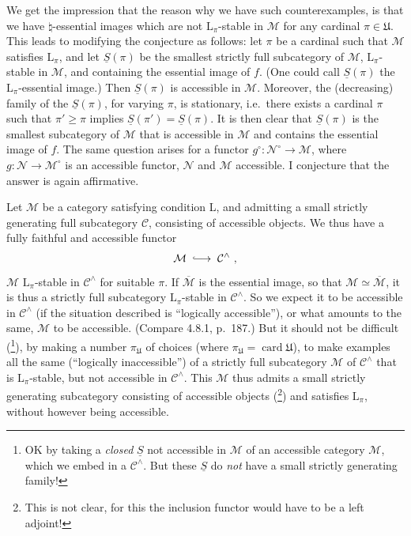 \documentclass[11pt]{article}
\newcommand{\printedpage}[1]{\marginpar{\footnotesize p.~#1}}
\newcommand{\msp}[1]{\marginpar{\footnotesize [#1]}}
\newcommand{\card}{\operatorname{card}}
\newcommand{\into}{\lhook\joinrel\longrightarrow}
\begin{document}
We get the impression that the reason why we have such counterexamples, is that we have $\natural$-essential images which are not $\mathrm{L}_\pi$-stable in $\mathcal{M}$ for any cardinal $\pi \in \mathfrak{U}$. This leads to modifying the conjecture as follows: let $\pi$ be a cardinal such that $\mathcal{M}$ satisfies $\mathrm{L}_\pi$,
\printedpage{182}
and let $\underline{S}(\pi)$ be the smallest strictly full subcategory of $\mathcal{M}$, $\mathrm{L}_\pi$-stable in $\mathcal{M}$, and containing the essential image of $f$. (One could call $\underline{S}(\pi)$ the $\mathrm{L}_\pi$-essential image.) Then $\underline{S}(\pi)$ is accessible in $\mathcal{M}$. Moreover, the (decreasing) family of the $\underline{S}(\pi)$, for varying $\pi$, is stationary, i.e.\ there exists a cardinal $\pi$ such that $\pi' \geqslant \pi$ implies $\underline{S}(\pi') = \underline{S}(\pi)$. It is then clear that $\underline{S}(\pi)$ is the smallest subcategory of $\mathcal{M}$ that is accessible in $\mathcal{M}$ and contains the essential image of $f$. The same question arises for a functor $g^\circ : \mathcal{N}^\circ \longrightarrow \mathcal{M}$, where $g : \mathcal{N} \longrightarrow \mathcal{M}^\circ$ is an accessible functor, $\mathcal{N}$ and $\mathcal{M}$ accessible. I conjecture that the answer is again affirmative.

\msp{471}

Let $\mathcal{M}$ be a category satisfying condition L, and admitting a small strictly generating full subcategory $\mathcal{C}$, consisting of accessible objects. We thus have a fully faithful and accessible functor
\[
\mathcal{M} \;\into\; \mathcal{C}^\wedge\ ,
\]
$\mathcal{M}$ $\mathrm{L}_\pi$-stable in $\mathcal{C}^\wedge$ for suitable $\pi$. If $\overline{\mathcal{M}}$ is the essential image, so that $\mathcal{M} \simeq \overline{\mathcal{M}}$, it is thus a strictly full subcategory $\mathrm{L}_\pi$-stable in $\mathcal{C}^\wedge$. So we expect it to be accessible in $\mathcal{C}^\wedge$ (if the situation described is ``logically accessible''), or what amounts to the same, $\mathcal{M}$ to be accessible. (Compare 4.8.1, p.~187.) But it should not be difficult (\footnote[192]{OK by taking a \textit{closed} $\underline{S}$ not accessible in $\mathcal{M}$ of an accessible category $\mathcal{M}$, which we embed in a $\mathcal{C}^\wedge$. But these $\underline{S}$ do \textit{not} have a small strictly generating family! %
}), by making a number $\pi_{\mathfrak{U}}$ of choices (where $\pi_{\mathfrak{U}} = \card\mathfrak{U}$), to make examples all the same (``logically inaccessible'') of a strictly full subcategory $\mathcal{M}$ of $\mathcal{C}^\wedge$ that is $\mathrm{L}_\pi$-stable, but not accessible in $\mathcal{C}^\wedge$. This $\mathcal{M}$ thus admits a small strictly generating subcategory consisting of accessible objects (\footnote[193]{This is not clear, for this the inclusion functor would have to be a left adjoint!}) and satisfies $\mathrm{L}_\pi$, without however being accessible.
\end{document}
